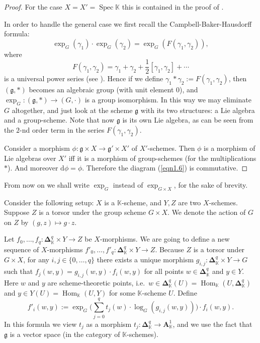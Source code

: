 \documentclass[10pt]{amsart}
\theoremstyle{definition}
\numberwithin{equation}{section}
\newcommand{\opn}{\operatorname}
\newcommand{\mfrak}[1]{\mathfrak{#1}}
\newcommand{\mbf}[1]{\mathbf{#1}}
\newcommand{\mrm}[1]{\mathrm{#1}}
\newcommand{\mbb}[1]{\mathbb{#1}}
\newcommand{\smfrac}[2]{{\textstyle \frac{#1}{#2}}}
\newcommand{\bsym}[1]{\boldsymbol{#1}}
\newcommand{\set}[1]{\{ #1 \}}
\newcommand{\K}{\mbb{K}}
\begin{document}
\begin{proof}
For the case $X = X' = \opn{Spec} \K$ this is contained in the 
proof of \cite[Theorem VIII.1.2]{Ho}.

In order to handle the general case we first recall the 
Campbell-Baker-Hausdorff formula:
\[ \opn{exp}_{G}(\gamma_1) \cdot \opn{exp}_{G}(\gamma_2) =
\opn{exp}_{G}(F(\gamma_1, \gamma_2)) , \]
where 
\[ F(\gamma_1, \gamma_2) = \gamma_1 + \gamma_2 + 
\smfrac{1}{2} [\gamma_1, \gamma_2] + \cdots \]
is a universal power series (see \cite[Section XVI.2]{Ho}).
Hence if we define 
$\gamma_1 * \gamma_2 := F(\gamma_1, \gamma_2)$,
then $(\mfrak{g}, *)$ becomes an algebraic group (with unit 
element $0$), and 
$\opn{exp}_{G} : (\mfrak{g}, *) \to (G, \cdot)$
is a group isomorphism. In this way we may eliminate $G$ 
altogether, and just look at the scheme $\mfrak{g}$ with its two 
structures: a Lie algebra and a group-scheme. Note that now
$\mfrak{g}$ is its own Lie algebra, as can be seen from the $2$-nd 
order term in the series $F(\gamma_1, \gamma_2)$. 

Consider a morphism 
$\phi : \mfrak{g} \times X \to \mfrak{g}' \times X'$
of $X'$-schemes. Then $\phi$ is a morphism of Lie algebras over 
$X'$ iff it is a morphism of group-schemes (for the 
multiplications $*$). And moreover $\mrm{d} \phi = \phi$. 
Therefore the diagram (\ref{eqn1.6}) is commutative.
\end{proof}

From now on we shall write $\opn{exp}_{G}$ instead of
$\opn{exp}_{G \times X}$, for the sake of brevity.

Consider the following setup: $X$ is a $\K$-scheme, 
and $Y, Z$ are two $X$-schemes.
Suppose $Z$ is a torsor under the group scheme $G \times X$. 
We denote the action of $G$ 
on $Z$ by $(g, z) \mapsto g \cdot z$.

Let $f_0, \ldots, f_q : \bsym{\Delta}^q_{\K} \times Y \to Z$ 
be $X$-morphisms. 
We are going to define a new sequence of $X$-morphisms 
$f'_0, \ldots, f'_q : \bsym{\Delta}^q_{\K} \times Y \to Z$.
Because $Z$ is a torsor under $G \times X$, for any 
$i, j \in \set{0, \ldots, q}$ there exists a unique morphism
$g_{i, j} : \bsym{\Delta}^q_{\K} \times Y \to G$ 
such that $f_j(w, y) = g_{i, j}(w, y) \cdot f_i(w, y)$
for all points $w \in \bsym{\Delta}^q_{\K}$ and 
$y \in Y$. Here $w$ and $y$ are scheme-theoretic points,
i.e.\ 
$w \in \bsym{\Delta}^q_{\K}(U) = 
\opn{Hom}_{\K}(U, \bsym{\Delta}^q_{\K})$ 
and 
$y \in Y(U) = \opn{Hom}_{\K}(U, Y)$ 
for some $\K$-scheme $U$. Define
\begin{equation} \label{eqn6.X1}
f'_i(w, y) := \opn{exp}_G \Big( \sum_{j=0}^q t_j(w) \cdot
\opn{log}_G(g_{i, j}(w, y)) \Big) \cdot f_i(w, y) . 
\end{equation}
In this formula we view $t_j$ as a morphism 
$t_j : \bsym{\Delta}^q_{\K} \to \mbf{A}^1_{\K}$,
and we use the fact that $\mfrak{g}$ is a vector space
(in the category of $\K$-schemes).
\end{document}
